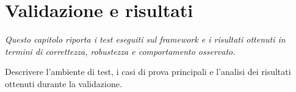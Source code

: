 \chapter{Validazione e risultati}
\begin{minipage}{12cm}\textit{Questo capitolo riporta i test eseguiti sul framework e i risultati ottenuti in termini di correttezza, robustezza e comportamento osservato.}
\end{minipage}
\vspace*{1cm}

Descrivere l'ambiente di test, i casi di prova principali e l'analisi dei risultati ottenuti durante la validazione.
